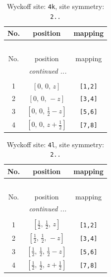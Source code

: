 \documentclass[fleqn,8pt]{jsarticle}
\begin{document}
\renewcommand{\arraystretch}{1.2}
\begin{longtable}{ccc}
\caption{Wyckoff site: {\tt 4k}, site symmetry: {\tt 2..}}
 \\
 \hline \hline
No. & position & mapping \\ \hline \endfirsthead

\multicolumn{2}{l}{\tablename\ \thetable{}} \\
 \hline \hline
No. & position & mapping \\ \hline \endhead

 \hline \hline
\multicolumn{2}{r}{\footnotesize\it continued ...} \\ \endfoot

 \hline \hline
\multicolumn{2}{r}{} \\ \endlastfoot

1 & $\left[ 0,\, 0,\, z \right]$ & {\tt [1,2]} \\ \hline
2 & $\left[ 0,\, 0,\, - z \right]$ & {\tt [3,4]} \\ \hline
3 & $\left[ 0,\, 0,\, \frac{1}{2} - z \right]$ & {\tt [5,6]} \\ \hline
4 & $\left[ 0,\, 0,\, z + \frac{1}{2} \right]$ & {\tt [7,8]} \\
\end{longtable}
\renewcommand{\arraystretch}{1.2}
\begin{longtable}{ccc}
\caption{Wyckoff site: {\tt 4l}, site symmetry: {\tt 2..}}
 \\
 \hline \hline
No. & position & mapping \\ \hline \endfirsthead

\multicolumn{2}{l}{\tablename\ \thetable{}} \\
 \hline \hline
No. & position & mapping \\ \hline \endhead

 \hline \hline
\multicolumn{2}{r}{\footnotesize\it continued ...} \\ \endfoot

 \hline \hline
\multicolumn{2}{r}{} \\ \endlastfoot

1 & $\left[ \frac{1}{2},\, \frac{1}{2},\, z \right]$ & {\tt [1,2]} \\ \hline
2 & $\left[ \frac{1}{2},\, \frac{1}{2},\, - z \right]$ & {\tt [3,4]} \\ \hline
3 & $\left[ \frac{1}{2},\, \frac{1}{2},\, \frac{1}{2} - z \right]$ & {\tt [5,6]} \\ \hline
4 & $\left[ \frac{1}{2},\, \frac{1}{2},\, z + \frac{1}{2} \right]$ & {\tt [7,8]} \\
\end{longtable}
\end{document}
